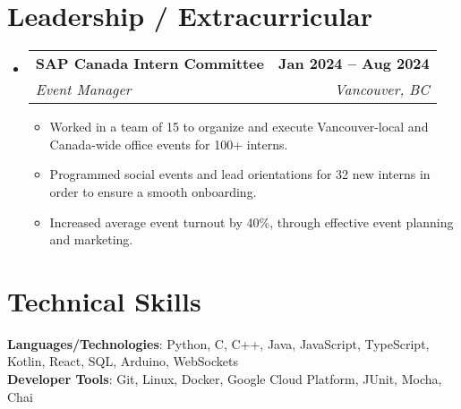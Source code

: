 \documentclass[letterpaper,11pt]{article}
\makeatletter
\newcommand{\bluey}[1]{{\color{customblue}#1}}
\newcommand{\resumeItem}[1]{
  \item\small{
    {#1 \vspace{-2pt}}
  }
}
\newcommand{\resumeSubheading}[4]{
  \vspace{-2pt}\item
    \begin{tabular*}{1.0\textwidth}[t]{l@{\extracolsep{\fill}}r}
      \textbf{#1} & \textbf{\small #2} \\
      \textit{\small#3} & \textit{\small #4} \\
    \end{tabular*}\vspace{-7pt}
}
\newcommand{\resumeSubHeadingListStart}{\begin{itemize}[leftmargin=0.0in, label={}]}
\newcommand{\resumeSubHeadingListEnd}{\end{itemize}}
\newcommand{\resumeItemListStart}{\begin{itemize}}
\newcommand{\resumeItemListEnd}{\end{itemize}\vspace{-5pt}}
\makeatother
\begin{document}
\section{Leadership / Extracurricular}
    \resumeSubHeadingListStart
        \resumeSubheading{\bluey{SAP Canada Intern Committee}}{Jan 2024 -- Aug 2024}{\bluey{Event Manager}}{Vancouver, BC}
            \resumeItemListStart
                \resumeItem{Worked in a team of 15 to organize and execute Vancouver-local and Canada-wide office events for 100+ interns.}
                \resumeItem{Programmed social events and lead orientations for 32 new interns in order to ensure a smooth onboarding.}
                \resumeItem{Increased average event turnout by 40\%, through effective event planning and marketing.}
            \resumeItemListEnd
        
    \resumeSubHeadingListEnd
\section{Technical Skills}
 \begin{itemize}[leftmargin=0.15in, label={}]
    \small{\item{
    \textbf{Languages/Technologies}{: Python, C, C++, Java, JavaScript, TypeScript, Kotlin, React, SQL, Arduino, WebSockets}\\
    \textbf{Developer Tools}{: Git, Linux, Docker, Google Cloud Platform, JUnit, Mocha, Chai} \\
    }}
 \end{itemize}
 \vspace{-16pt}

%
\end{document}
